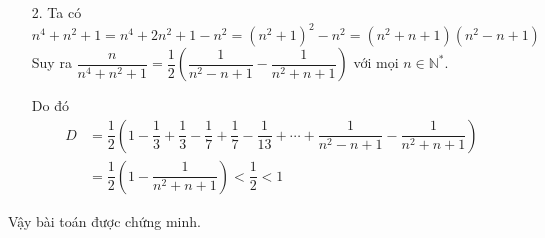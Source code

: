 \begin{ex}
{\begin{enumerate}
    	Dấu đẳng thức xảy ra khi 
    	$$\sqrt{x} + 1 = \dfrac{9}{\sqrt{x} + 1}\Leftrightarrow \left(\sqrt{x} + 1\right)^{2} = 9\Leftrightarrow \sqrt{x} + 1 = 3\Leftrightarrow \sqrt{x} = 2 \Leftrightarrow x = 4.$$
    	Do đó $C\geq 4$ với mọi $x$ thỏa mãn $(*)$. Dấu đẳng thức xảy ra khi $x = 4$. 
    	Vậy giá trị nhỏ nhất của $C$ bằng $4$ khi  $x = 4$. 
     	\item [2.] Ta có 
     	$$n^4 + n^2 + 1 = n^4 + 2n^2 + 1 - n^2 = \left(n^2 + 1\right)^2 - n^2 = \left(n^2 + n + 1\right)\left(n^2 - n + 1\right)$$
     	Suy ra $\dfrac{n}{n^4 + n^2 + 1} = \dfrac{1}{2}\left(\dfrac{1}{n^2 - n + 1} - \dfrac{1}{n^2 + n + 1}\right)$ với mọi $n\in \mathbb{N}^{*}$.
     	
     	Do đó   
     	\begin{align*}
     	D &= \dfrac{1}{2}\left(1 - \dfrac{1}{3} + \dfrac{1}{3} - \dfrac{1}{7} + \dfrac{1}{7} - \dfrac{1}{13} + \cdots + \dfrac{1}{n^2 - n + 1} - \dfrac{1}{n^2 + n + 1}\right)\\
     	 &= \dfrac{1}{2}\left(1 - \dfrac{1}{n^2 + n + 1}\right) < \dfrac{1}{2} < 1
     \end{align*}
      \end{enumerate}
    Vậy bài toán được chứng minh.
      }
\end{ex}

